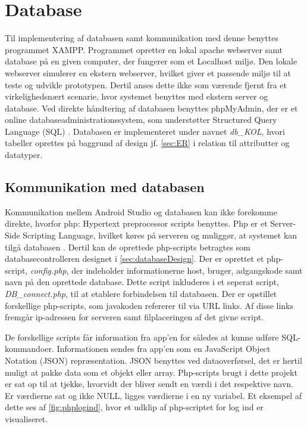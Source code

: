 \section{Database}
Til implementering af databasen samt kommunikation med denne benyttes programmet XAMPP. Programmet opretter en lokal apache webserver samt database på en given computer, der fungerer som et Localhost miljø. Den lokale webserver simulerer en ekstern webserver, hvilket giver et passende miljø til at teste og udvikle prototypen. Dertil anses dette ikke som værende fjernt fra et virkelighedsnært scenarie, hvor systemet benyttes med ekstern server og database.
Ved direkte håndtering af databasen benyttes phpMyAdmin, der er et online databaseadministrationssystem, som understøtter Structured Query Language (SQL) \cite{silbershatz2011}. 
Databasen er implementeret under navnet \textit{db\_KOL}, hvori tabeller oprettes på baggrund af design jf. \autoref{sec:ER} i relation til attributter og datatyper.

\subsection{Kommunikation med databasen}
Kommunikation mellem Android Studio og databasen kan ikke forekomme direkte, hvorfor php: Hypertext preprocessor scripts benyttes. Php er et Server-Side Scripting Language, hvilket køres på serveren og muliggør, at systemet kan tilgå databasen \cite{silbershatz2011}. Dertil kan de oprettede php-scripts betragtes som databasecontrolleren designet i \autoref{sec:databaseDesign}.
Der er oprettet et php-script, \textit{config.php}, der indeholder informationerne host, bruger, adgangskode samt navn på den oprettede database. Dette script inkluderes i et seperat script, \textit{DB\_connect.php}, til at etablere forbindelsen til databasen. Der er opstillet forskellige php-scripts, som javakoden refererer til via URL links. Af disse links fremgår ip-adressen for serveren samt filplaceringen af det givne script. 

De forskellige scripts får information fra app'en for således at kunne udføre SQL-kommandoer. Informationen sendes fra app'en som en JavaScript Object Notation (JSON) repræsentation. JSON benyttes ved dataoverførsel, det er hertil muligt at pakke data som et objekt eller array.\cite{silbershatz2011} Php-scripts brugt i dette projekt er sat op til at tjekke, hvorvidt der bliver sendt en værdi i det respektive navn. Er værdierne sat og ikke NULL, ligges værdierne i en ny variabel. Et eksempel af dette ses af \autoref{fig:phplogind}, hvor et udklip af php-scriptet for log ind er visualiseret. 

